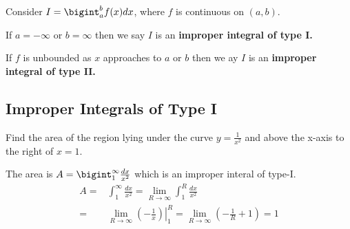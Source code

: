 \documentclass[../calc1-main.tex]{subfiles}
\begin{document}
Consider $I = \bigint_a^b f(x) dx$, where $f$ is continuous on $(a, b)$.

If $a=-\infty$ or $b=\infty$ then we say $I$ is an \textbf{improper integral of type I.}

If $f$ is unbounded as $x$ approaches to $a$ or $b$ then we ay $I$ is an \textbf{improper integral of type II.}

\subsection*{Improper Integrals of Type I}
\begin{example}
	Find the area of the region lying under the curve $y=\frac{1}{x^2}$ and above the x-axis to the right of $x=1$.
\end{example}

\begin{minipage}{0.5\textwidth}
  \begin{solution}
  	The area is $A = \bigint_1^{\infty} \frac{dx}{x^2}$ which is an improper interal  of type-I.
  	\[
  	\begin{split}
  		A = & 
  		\int_1^{\infty} \frac{dx}{x^2} = \lim_{R \to \infty} \int_1^R \frac{dx}{x^2} \\
  		= & \lim_{R \to \infty} \left.\left( -\frac{1}{x} \right)\right \vert_1^R= 
  		\lim_{R \to \infty} \left( -\frac{1}{R} + 1 \right) = 
  		1
  	\end{split}
  	\]
  \end{solution}
\end{minipage}%
\begin{minipage}{0.5\textwidth}
	\begin{figure}[H]
  \centering
	\end{figure}
\end{minipage}
\end{document}
